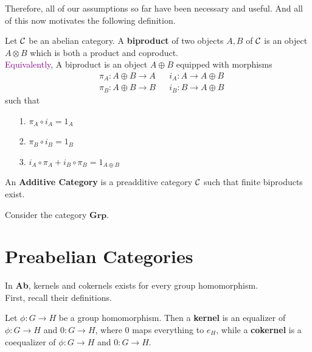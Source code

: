 Therefore, all of our assumptions so far have been necessary and useful. And all of 
this now motivates the following definition. 

\begin{definition}
    Let $\mathcal{C}$ be an abelian category.
    A \textbf{biproduct} of two objects $A, B$ of $\mathcal{C}$ is an object 
    $A \otimes B$ which is both a product and coproduct.
    \\
    \textcolor{Purple}{Equivalently}, A biproduct is an object $A \oplus B$ 
    equipped with morphisms 
    \begin{align*}
        &\pi_A: A \oplus B \to A && i_A: A \to A \oplus B\\
        &\pi_B: A \oplus B \to B && i_B: B \to A \oplus B
    \end{align*}
    such that 
    \begin{itemize}
        \item[1.] $\pi_A \circ i_A = 1_A$
        \item[2.] $\pi_B \circ i_B = 1_B$
        \item[3.] $i_A \circ \pi_A + i_B \circ \pi_B = 1_{A\oplus B}$  
    \end{itemize}
\end{definition}

\begin{definition}
    An \textbf{Additive Category} is a preadditive category $\mathcal{C}$ 
    such that finite biproducts exist. 
\end{definition}

\begin{definition}
    Consider the category $\textbf{Grp}$. 
\end{definition}



\newpage 
\section{Preabelian Categories}
In \textbf{Ab}, kernels and cokernels exists for every group homomorphism.
\\

First, recall their definitions. 
\begin{definition}
    Let $\phi: G \to H$ be a group homomorphism. Then a \textbf{kernel} is 
    an equalizer of $\phi: G \to H$ and $0: G \to H$, where $0$ maps everything to $e_H$, 
    while a \textbf{cokernel} is a coequalizer of $\phi: G \to H$ and $0: G \to H$. 
    \begin{center}
    \end{center}
\end{definition}

